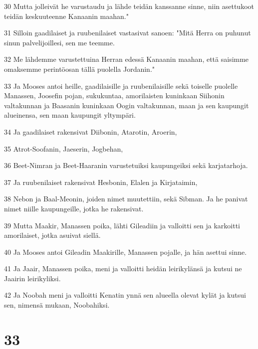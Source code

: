 \par 30 Mutta jolleivät he varustaudu ja lähde teidän kanssanne sinne, niin asettukoot teidän keskuuteenne Kanaanin maahan."
\par 31 Silloin gaadilaiset ja ruubenilaiset vastasivat sanoen: "Mitä Herra on puhunut sinun palvelijoillesi, sen me teemme.
\par 32 Me lähdemme varustettuina Herran edessä Kanaanin maahan, että saisimme omaksemme perintöosan tällä puolella Jordanin."
\par 33 Ja Mooses antoi heille, gaadilaisille ja ruubenilaisille sekä toiselle puolelle Manassen, Joosefin pojan, sukukuntaa, amorilaisten kuninkaan Siihonin valtakunnan ja Baasanin kuninkaan Oogin valtakunnan, maan ja sen kaupungit alueinensa, sen maan kaupungit yltympäri.
\par 34 Ja gaadilaiset rakensivat Diibonin, Atarotin, Aroerin,
\par 35 Atrot-Soofanin, Jaeserin, Jogbehan,
\par 36 Beet-Nimran ja Beet-Haaranin varustetuiksi kaupungeiksi sekä karjatarhoja.
\par 37 Ja ruubenilaiset rakensivat Hesbonin, Elalen ja Kirjataimin,
\par 38 Nebon ja Baal-Meonin, joiden nimet muutettiin, sekä Sibman. Ja he panivat nimet niille kaupungeille, jotka he rakensivat.
\par 39 Mutta Maakir, Manassen poika, lähti Gileadiin ja valloitti sen ja karkoitti amorilaiset, jotka asuivat siellä.
\par 40 Ja Mooses antoi Gileadin Maakirille, Manassen pojalle, ja hän asettui sinne.
\par 41 Ja Jaair, Manassen poika, meni ja valloitti heidän leirikylänsä ja kutsui ne Jaairin leirikyliksi.
\par 42 Ja Noobah meni ja valloitti Kenatin ynnä sen alueella olevat kylät ja kutsui sen, nimensä mukaan, Noobahiksi.

\chapter{33}

